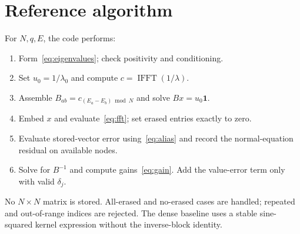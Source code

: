 \documentclass[11pt]{article}
\newcommand{\one}{\boldsymbol 1}\newcommand{\norm}[1]{\left\lVert#1\right\rVert}
\begin{document}
\section{Reference algorithm}
For $N,q,E$, the code performs:
\begin{enumerate}[leftmargin=*,itemsep=2pt]
\item Form~\eqref{eq:eigenvalues}; check positivity and conditioning.
\item Set $u_0=1/\lambda_0$ and compute $c=\operatorname{IFFT}(1/\lambda)$.
\item Assemble $B_{ab}=c_{(E_a-E_b)\bmod N}$ and solve $Bx=u_0\one$.
\item Embed $x$ and evaluate~\eqref{eq:fft}; set erased entries exactly to zero.
\item Evaluate stored-vector error using~\eqref{eq:alias} and record the normal-equation residual on available nodes.
\item Solve for $B^{-1}$ and compute gains~\eqref{eq:gain}. Add the value-error term only with valid $\delta_j$.
\end{enumerate}
No $N\times N$ matrix is stored. All-erased and no-erased cases are handled; repeated and out-of-range indices are rejected. The dense baseline uses a stable sine-squared kernel expression without the inverse-block identity.
\end{document}
